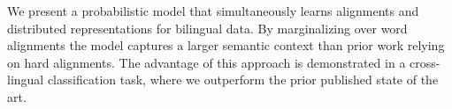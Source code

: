 We present a probabilistic model that simultaneously learns alignments and distributed representations for bilingual data. By marginalizing over word alignments the model captures a larger semantic context than prior work relying on hard alignments. The advantage of this approach is demonstrated in a cross-lingual classification task, where we outperform the prior published state of the art.
